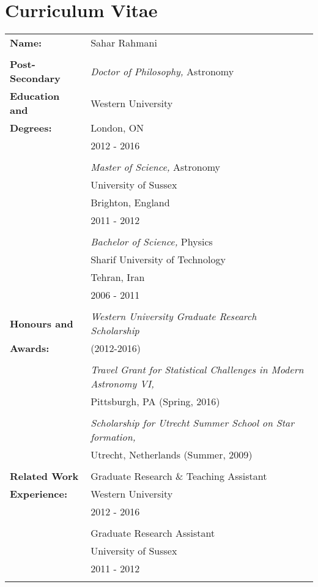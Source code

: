 \documentclass[12pt,twoside]{report}
\numberwithin{figure}{chapter}
\newcommand{\firstname}{Sahar}
\newcommand{\lastname}{Rahmani}
\begin{document}
\chapter*{Curriculum Vitae}
\begin{table}[ht]
\begin{tabular}{ll}
\textbf{Name:} & \firstname{} \lastname\\\\
\textbf{Post-Secondary} & {\sl Doctor of Philosophy,} Astronomy \\
\textbf{Education and}& Western University\\
\textbf{Degrees:}& London, ON\\
& 2012 - 2016\\\\
&{\sl Master of Science,} Astronomy \\
& University of Sussex \\
& Brighton, England\\
& 2011 - 2012\\\\
& {\sl Bachelor of Science,} Physics \\
& Sharif University of Technology \\
& Tehran, Iran \\
& 2006 - 2011\\\\
\textbf{Honours and}& {\sl Western University Graduate Research Scholarship}\\
\textbf{Awards:}&(2012-2016)\\\\
& {\sl Travel Grant for Statistical Challenges in Modern Astronomy VI,}\\
&  Pittsburgh, PA (Spring, 2016)\\\\
&{\sl Scholarship for Utrecht Summer School on Star formation,}\\
&Utrecht, Netherlands (Summer, 2009)\\\\
\textbf{Related Work}& Graduate Research \& Teaching Assistant\\
\textbf{Experience:}& Western University\\
& 2012 - 2016\\\\
&Graduate Research Assistant\\
& University of Sussex \\
& 2011 - 2012\\\\
\end{tabular}
\end{table}
\end{document}
